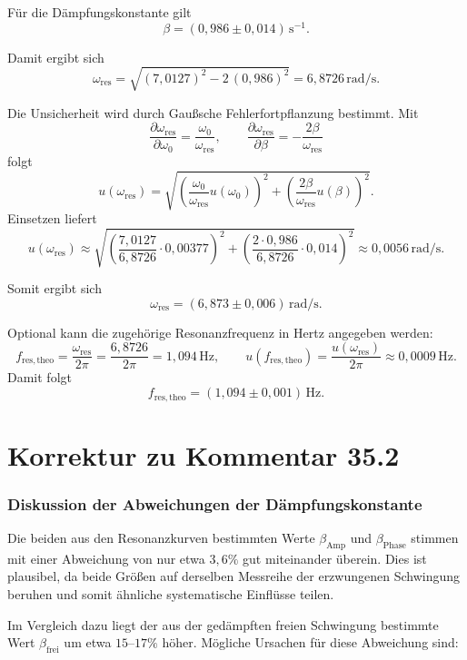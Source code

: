 \documentclass{report}
\begin{document}
Für die Dämpfungskonstante gilt
\[
\beta=(0{,}986\pm 0{,}014)\,\mathrm{s^{-1}}.
\]

Damit ergibt sich
\[
\omega_\mathrm{res}=\sqrt{(7{,}0127)^2-2\,(0{,}986)^2}=6{,}8726\,\mathrm{rad/s}.
\]

Die Unsicherheit wird durch Gaußsche Fehlerfortpflanzung bestimmt. Mit
\[
\frac{\partial \omega_\mathrm{res}}{\partial \omega_0}=\frac{\omega_0}{\omega_\mathrm{res}},
\qquad
\frac{\partial \omega_\mathrm{res}}{\partial \beta}=-\frac{2\beta}{\omega_\mathrm{res}}
\]
folgt
\[
u(\omega_\mathrm{res})=
\sqrt{\left(\frac{\omega_0}{\omega_\mathrm{res}}u(\omega_0)\right)^2+
\left(\frac{2\beta}{\omega_\mathrm{res}}u(\beta)\right)^2 }.
\]
Einsetzen liefert
\[
u(\omega_\mathrm{res})\approx
\sqrt{\left(\frac{7{,}0127}{6{,}8726}\cdot 0{,}00377\right)^2+
\left(\frac{2\cdot 0{,}986}{6{,}8726}\cdot 0{,}014\right)^2}
\approx 0{,}0056\,\mathrm{rad/s}.
\]

Somit ergibt sich
\[
\boxed{\omega_\mathrm{res}=(6{,}873\pm 0{,}006)\,\mathrm{rad/s}}.
\]

Optional kann die zugehörige Resonanzfrequenz in Hertz angegeben werden:
\[
f_{\mathrm{res,theo}}=\frac{\omega_\mathrm{res}}{2\pi}
=\frac{6{,}8726}{2\pi}
=1{,}094\,\mathrm{Hz},
\qquad
u(f_{\mathrm{res,theo}})=\frac{u(\omega_\mathrm{res})}{2\pi}\approx 0{,}0009\,\mathrm{Hz}.
\]
Damit folgt
\[
\boxed{f_{\mathrm{res,theo}}=(1{,}094\pm 0{,}001)\,\mathrm{Hz}}.
\]

\section{Korrektur zu Kommentar 35.2}

\subsubsection*{Diskussion der Abweichungen der Dämpfungskonstante}

Die beiden aus den Resonanzkurven bestimmten Werte $\beta_{\text{Amp}}$ und $\beta_{\text{Phase}}$ stimmen mit einer Abweichung von nur etwa $3{,}6\%$ gut miteinander überein. Dies ist plausibel, da beide Größen auf derselben Messreihe der erzwungenen Schwingung beruhen und somit ähnliche systematische Einflüsse teilen. 

Im Vergleich dazu liegt der aus der gedämpften freien Schwingung bestimmte Wert $\beta_{\text{frei}}$ um etwa $15$--$17\%$ höher. Mögliche Ursachen für diese Abweichung sind:
\end{document}
